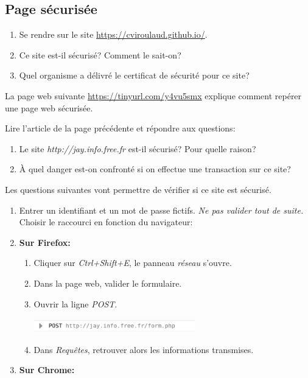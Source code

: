 \documentclass[a4paper,11pt]{article}
\begin{document}
\begin{Form}
\subsection{Page sécurisée}
\begin{activite}
\begin{enumerate}
\item Se rendre sur le site \mbox{\url{https://cviroulaud.github.io/}}.
\item Ce site est-il sécurisé? Comment le sait-on?
\item Quel organisme a délivré le certificat de sécurité pour ce site? 
\end{enumerate}
\end{activite}
\noindent La page web suivante \mbox{\url{https://tinyurl.com/y4vu5smx}} explique comment repérer une page web sécurisée.
\begin{activite}
Lire l'article de la page précédente et répondre aux questions:
\begin{enumerate}
\item Le site \emph{http://jay.info.free.fr} est-il sécurisé? Pour quelle raison?
\item À quel danger est-on confronté si on effectue une transaction sur ce site? 
\end{enumerate}
Les questions suivantes vont permettre de vérifier si ce site est sécurisé.
\begin{enumerate}[resume]
\item Entrer un identifiant et un mot de passe fictifs. \emph{Ne pas valider tout de suite.}
\\Choisir le raccourci en fonction du navigateur:
\item \textbf{Sur Firefox:}
\begin{enumerate}
\item  Cliquer sur \emph{Ctrl+Shift+E}, le panneau \emph{réseau} s'ouvre.
\item Dans la page web, valider le formulaire.
\item Ouvrir la ligne \emph{POST}.
\begin{center}
\includegraphics[width=7cm]{ressources/post-ff.png}
\end{center}
\item Dans \emph{Requêtes}, retrouver alors les informations transmises.
\end{enumerate}
\item \textbf{Sur Chrome:}

\end{enumerate}
\end{activite}
\end{Form}
\end{document}
